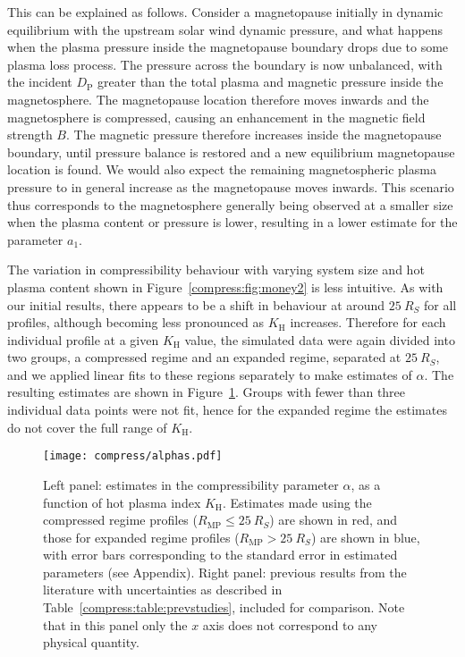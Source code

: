 This can be explained as follows. Consider a magnetopause initially in dynamic equilibrium with the upstream solar wind dynamic pressure, and what happens when the plasma pressure inside the magnetopause boundary drops due to some plasma loss process. The pressure across the boundary is now unbalanced, with the incident $D_\mathrm{P}$ greater than the total plasma and magnetic pressure inside the magnetosphere. The magnetopause location therefore moves inwards and the magnetosphere is compressed, causing an enhancement in the magnetic field strength $B$. The magnetic pressure therefore increases inside the magnetopause boundary, until pressure balance is restored and a new equilibrium magnetopause location is found. We would also expect the remaining magnetospheric plasma pressure to in general increase as the magnetopause moves inwards. This scenario thus corresponds to the magnetosphere generally being observed at a smaller size when the plasma content or pressure is lower, resulting in a lower estimate for the parameter $a_1$.

The variation in compressibility behaviour with varying system size and hot plasma content shown in Figure~\ref{compress:fig:money2} is less intuitive. As with our initial results, there appears to be a shift in behaviour at around $\SI{25}{R_S}$ for all profiles, although becoming less pronounced as $K_\mathrm{H}$ increases. Therefore for each individual profile at a given $K_\mathrm{H}$ value, the simulated data were again divided into two groups, a compressed regime and an expanded regime, separated at $\SI{25}{R_S}$, and we applied linear fits to these regions separately to make estimates of $\alpha$. The resulting estimates are shown in Figure~\ref{compress:fig:alphas}. Groups with fewer than three individual data points were not fit, hence for the expanded regime the estimates do not cover the full range of $K_\mathrm{H}$.
\begin{figure}
\centering
\noindent\texttt{[image: compress/alphas.pdf]}
\caption[Estimates of magnetospheric compressibility parameter $\alpha$, for different system sizes and $K_\mathrm{H}$ values.]{Left panel: estimates in the compressibility parameter $\alpha$, as a function of hot plasma index $K_\mathrm{H}$. Estimates made using the compressed regime profiles ($R_\mathrm{MP} \leq \SI{25}{R_S}$) are shown in red, and those for expanded regime profiles ($R_\mathrm{MP} > \SI{25}{R_S}$) are shown in blue, with error bars corresponding to the standard error in estimated parameters (see Appendix). Right panel: previous results from the literature with uncertainties as described in Table~\ref{compress:table:prevstudies}, included for comparison. Note that in this panel only the $x$ axis does not correspond to any physical quantity.}
\label{compress:fig:alphas}
\end{figure}

